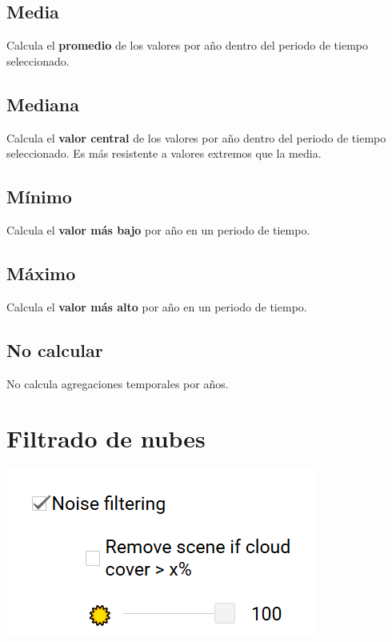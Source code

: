 \documentclass[
]{book}
\begin{document}
\section{\texorpdfstring{\textbf{Media}}{Media}}\label{media-1}

Calcula el \textbf{promedio} de los valores por año dentro del periodo de tiempo seleccionado.

\section{\texorpdfstring{\textbf{Mediana}}{Mediana}}\label{mediana-1}

Calcula el \textbf{valor central} de los valores por año dentro del periodo de tiempo seleccionado. Es más resistente a valores extremos que la media.

\section{\texorpdfstring{\textbf{Mínimo}}{Mínimo}}\label{muxednimo-1}

Calcula el \textbf{valor más bajo} por año en un periodo de tiempo.

\section{\texorpdfstring{\textbf{Máximo}}{Máximo}}\label{muxe1ximo-1}

Calcula el \textbf{valor más alto} por año en un periodo de tiempo.

\section{\texorpdfstring{\textbf{No calcular}}{No calcular}}\label{no-calcular}

No calcula agregaciones temporales por años.

\chapter{Filtrado de nubes}\label{filtrado-nubes}

\includegraphics{assets/filter.png}
\end{document}
